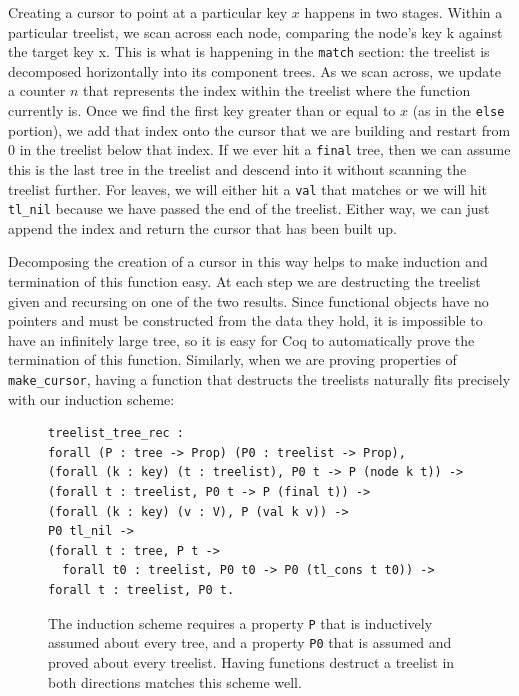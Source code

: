 \documentclass[a4paper,12pt]{article}
\begin{document}
Creating a cursor to point at a particular key $x$ happens in two stages. Within a particular treelist, we scan across each node, comparing the node’s key k against the target key x. This is what is happening in the \texttt{match} section: the treelist is decomposed horizontally into its component trees. As we scan across, we update a counter $n$ that represents the index within the treelist where the function currently is. Once we find the first key greater than or equal to $x$ (as in the \texttt{else} portion), we add that index onto the cursor that we are building and restart from 0 in the treelist below that index. If we ever hit a \texttt{final} tree, then we can assume this is the last tree in the treelist and descend into it without scanning the treelist further. For leaves, we will either hit a \texttt{val} that matches or we will hit \texttt{tl\_nil} because we have passed the end of the treelist. Either way, we can just append the index and return the cursor that has been built up.

Decomposing the creation of a cursor in this way helps to make induction and termination of this function easy. At each step we are destructing the treelist given and recursing on one of the two results. Since functional objects have no pointers and must be constructed from the data they hold, it is impossible to have an infinitely large tree, so it is easy for Coq to automatically prove the termination of this function. Similarly, when we are proving properties of \texttt{make\_cursor}, having a function that destructs the treelists naturally fits precisely with our induction scheme:

\begin{figure}[h]
\begin{singlespace}
\begin{verbatim}
treelist_tree_rec :
forall (P : tree -> Prop) (P0 : treelist -> Prop),
(forall (k : key) (t : treelist), P0 t -> P (node k t)) ->
(forall t : treelist, P0 t -> P (final t)) ->
(forall (k : key) (v : V), P (val k v)) ->
P0 tl_nil ->
(forall t : tree, P t ->
  forall t0 : treelist, P0 t0 -> P0 (tl_cons t t0)) ->
forall t : treelist, P0 t.
\end{verbatim}
\end{singlespace}
\caption{The induction scheme requires a property \texttt{P} that is inductively assumed about every tree, and a property \texttt{P0} that is assumed and proved about every treelist. Having functions destruct a treelist in both directions matches this scheme well.}
\label{fig:induction}
\end{figure}
\end{document}
